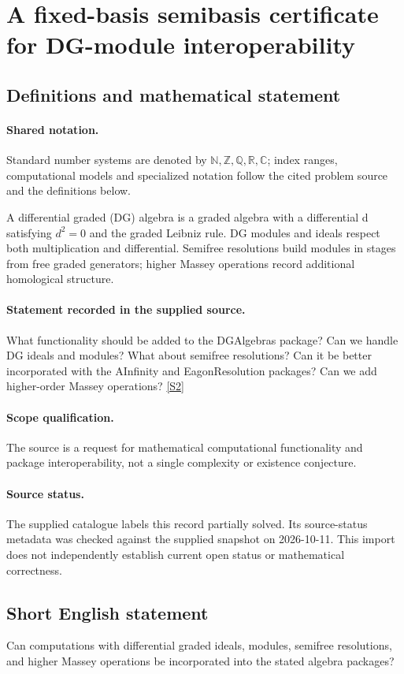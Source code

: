\documentclass[11pt]{article}
\newcommand{\sref}[2]{\hyperlink{source:#1:#2}{[S#2]}}
\begin{document}
\section{A fixed-basis semibasis certificate for DG-module interoperability}\label{statement}

\subsection{Definitions and mathematical statement}

\paragraph{Shared notation.}Standard number systems are denoted by $\mathbb N,\mathbb Z,\mathbb Q,\mathbb R,\mathbb C$; index ranges, computational models and specialized notation follow the cited problem source and the definitions below.


A differential graded (DG) algebra is a graded algebra with a differential d satisfying $d^2=0$ and the graded Leibniz rule. DG modules and ideals respect both multiplication and differential. Semifree resolutions build modules in stages from free graded generators; higher Massey operations record additional homological structure.
\paragraph{Statement recorded in the supplied source.}
What functionality should be added to the DGAlgebras package? Can we handle DG ideals and modules? What about semifree resolutions? Can it be better incorporated with the AInfinity and EagonResolution packages? Can we add higher-order Massey operations? \sref{statement}{2}
\paragraph{Scope qualification.}
The source is a request for mathematical computational functionality and package interoperability, not a single complexity or existence conjecture.
\paragraph{Source status.}
The supplied catalogue labels this record partially solved. Its source-status metadata was checked against the supplied snapshot on 2026-10-11. This import does not independently establish current open status or mathematical correctness.
\subsection{Short English statement}
Can computations with differential graded ideals, modules, semifree resolutions, and higher Massey operations be incorporated into the stated algebra packages?
\end{document}
